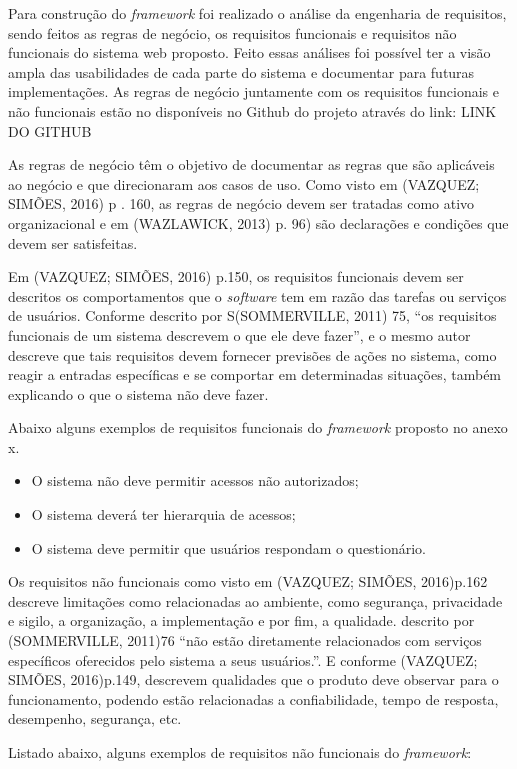 \documentclass[
	12pt,				%
	openright,			%
	oneside,			%
	a4paper,			%
	english,			%
	french,				%
	spanish,			%
	brazil,				%
	]{abntex2}
\begin{document}
Para construção do \textit{framework}  foi realizado o análise da engenharia de requisitos, sendo feitos as regras de negócio, os requisitos funcionais e requisitos não funcionais do sistema web proposto. Feito essas análises foi possível ter a visão ampla das usabilidades de cada parte do sistema e documentar para futuras implementações.  As regras de negócio juntamente com os requisitos funcionais e não funcionais estão no disponíveis no Github do projeto através do link: LINK DO GITHUB

As regras de negócio têm o objetivo de documentar as regras que são aplicáveis ao negócio e que direcionaram aos casos de uso. Como visto em (VAZQUEZ; SIMÕES, 2016) p . 160, as regras de negócio devem ser tratadas como ativo organizacional e em (WAZLAWICK, 2013) p. 96) são declarações e condições que devem ser satisfeitas.

Em (VAZQUEZ; SIMÕES, 2016) p.150, os requisitos funcionais devem ser descritos os comportamentos que o \textit{software} tem em razão das tarefas ou serviços de usuários. Conforme descrito por S(SOMMERVILLE, 2011) 75, “os requisitos funcionais de um sistema descrevem o que ele deve fazer”, e o mesmo autor descreve que tais requisitos devem fornecer previsões de ações no sistema, como reagir a entradas específicas e se comportar em determinadas situações, também explicando o que o sistema não deve fazer.

Abaixo alguns exemplos de requisitos funcionais do \textit{framework}  proposto no anexo x.
\begin{itemize}
\item O sistema não deve permitir acessos não autorizados;
\item O sistema deverá ter hierarquia de acessos;
\item O sistema deve permitir que usuários respondam o questionário.
\end{itemize}

Os requisitos não funcionais como visto em (VAZQUEZ; SIMÕES, 2016)p.162 descreve limitações como relacionadas ao ambiente, como segurança, privacidade e sigilo, a organização, a implementação e por fim, a qualidade. descrito por (SOMMERVILLE, 2011)76 “não estão diretamente relacionados com serviços específicos oferecidos pelo sistema a seus usuários.”. E conforme (VAZQUEZ; SIMÕES, 2016)p.149, descrevem qualidades que o produto deve observar para o funcionamento, podendo estão relacionadas a confiabilidade, tempo de resposta, desempenho, segurança, etc.

Listado abaixo, alguns exemplos de requisitos não funcionais do \textit{framework}:
\end{document}
